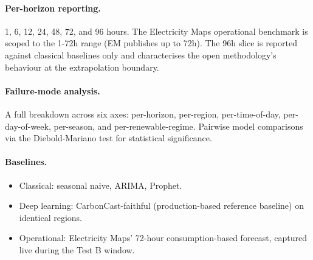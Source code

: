 \documentclass[sigconf,nonacm]{acmart}
\begin{document}
\paragraph{Per-horizon reporting.} 1, 6, 12, 24, 48, 72, and 96 hours. The Electricity Maps operational benchmark is scoped to the 1-72h range (EM publishes up to 72h). The 96h slice is reported against classical baselines only and characterises the open methodology's behaviour at the extrapolation boundary.

\paragraph{Failure-mode analysis.} A full breakdown across six axes: per-horizon, per-region, per-time-of-day, per-day-of-week, per-season, and per-renewable-regime. Pairwise model comparisons via the Diebold-Mariano test for statistical significance.

\paragraph{Baselines.}
\begin{itemize}
    \item Classical: seasonal naive, ARIMA, Prophet.
    \item Deep learning: CarbonCast-faithful (production-based reference baseline) on identical regions.
    \item Operational: Electricity Maps' 72-hour consumption-based forecast, captured live during the Test B window.
\end{itemize}



\end{document}
